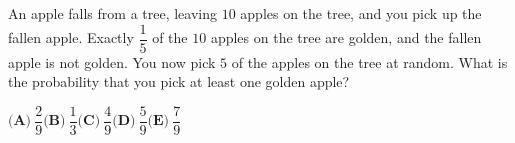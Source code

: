 An apple falls from a tree, leaving $10$ apples on the tree, and you pick up the fallen apple. Exactly $\dfrac15$ of the $10$ apples on the tree are golden, and the fallen apple is not golden. You now pick $5$ of the apples on the tree at random. What is the probability that you pick at least one golden apple?

$\textbf{(A)}\ \dfrac29$\qquad$\textbf{(B)}\ \dfrac13$\qquad$\textbf{(C)}\ \dfrac49$\qquad$\textbf{(D)}\ \dfrac59$\qquad$\textbf{(E)}\ \dfrac79$
